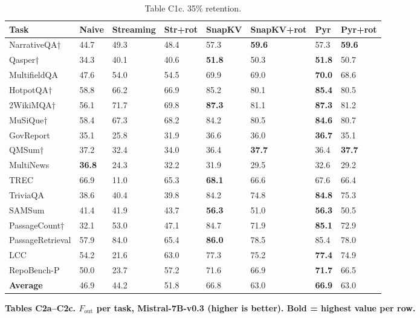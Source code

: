 \documentclass[10pt,letterpaper]{article}
\begin{document}
\begin{table}[H]
\centering
\small
\caption*{Table C1c. 35\% retention.}
\begin{tabular}{@{}llllllll@{}}
\toprule
Task & Naive & Streaming & Str+rot & SnapKV & SnapKV+rot & Pyr &
Pyr+rot\\
\midrule
    NarrativeQA† & 44.7 & 49.3 & 48.4 & 57.3 & \textbf{59.6} & 57.3 & \textbf{59.6}\\
    Qasper† & 34.3 & 40.1 & 40.6 & \textbf{51.8} & 50.3 & \textbf{51.8} & 50.7\\
    MultifieldQA & 47.6 & 54.0 & 54.5 & 69.9 & 69.0 & \textbf{70.0} & 68.6\\
    HotpotQA† & 58.8 & 66.2 & 66.9 & 85.2 & 80.1 & \textbf{85.4} & 80.5\\
    2WikiMQA† & 56.1 & 71.7 & 69.8 & \textbf{87.3} & 81.1 & \textbf{87.3} & 81.2\\
    MuSiQue† & 58.4 & 67.3 & 68.2 & 84.2 & 80.5 & \textbf{84.6} & 80.7\\
    GovReport & 35.1 & 25.8 & 31.9 & 36.6 & 36.0 & \textbf{36.7} & 35.1\\
    QMSum† & 37.2 & 32.4 & 34.0 & 36.4 & \textbf{37.7} & 36.4 & \textbf{37.7}\\
    MultiNews & \textbf{36.8} & 24.3 & 32.2 & 31.9 & 29.5 & 32.6 & 29.2\\
    TREC & 66.9 & 11.0 & 65.3 & \textbf{68.1} & 66.6 & 67.6 & 66.4\\
    TriviaQA & 38.6 & 40.4 & 39.8 & 84.2 & 74.8 & \textbf{84.8} & 75.3\\
    SAMSum & 41.4 & 41.9 & 43.7 & \textbf{56.3} & 51.0 & \textbf{56.3} & 50.5\\
    PassageCount† & 32.1 & 53.0 & 47.1 & 84.7 & 71.9 & \textbf{85.1} & 72.9\\
    PassageRetrieval & 57.9 & 84.0 & 65.4 & \textbf{86.0} & 78.5 & 85.4 & 78.0\\
    LCC & 54.2 & 21.6 & 63.0 & 77.3 & 75.2 & \textbf{77.4} & 74.9\\
    RepoBench-P & 50.0 & 23.7 & 57.2 & 71.6 & 66.9 & \textbf{71.7} & 66.5\\
    \textbf{Average} & 46.9 & 44.2 & 51.8 & 66.8 & 63.0 & \textbf{66.9} & 63.0\\
\bottomrule
\end{tabular}
\end{table}

\textbf{Tables C2a--C2c. \(F_{\text{out}}\) per task, Mistral-7B-v0.3
(higher is better). Bold = highest value per row.}
\end{document}
